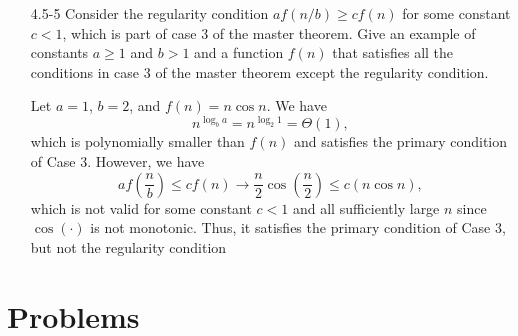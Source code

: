 \begin{enumerate}
\begin{framed}
\end{framed}

\item[4.5{-}5]{Consider the regularity condition $a f(n/b) \ge c f(n)$ for some
constant $c < 1$, which is part of case 3 of the master theorem. Give an example
of constants $a \ge 1$ and $b > 1$ and a function $f(n)$ that satisfies all
the conditions in case 3 of the master theorem except the regularity
condition.}

\begin{framed}
Let $a = 1$, $b = 2$, and $f(n) = n \cos n$. We have
\[
  n^{\log_b a} = n^{\log_2 1} = \Theta(1),
\]
which is polynomially smaller than $f(n)$ and satisfies the primary condition of
Case 3. However, we have
\[
  a f\left(\frac{n}{b}\right) \le c f(n) \rightarrow \frac{n}{2} \cos\left(\frac{n}{2}\right) \le c ( n \cos n ),
\]
which is not valid for some constant $c < 1$ and all sufficiently large $n$
since $\cos(\cdot)$ is not monotonic. Thus, it satisfies the primary condition
of Case 3, but not the regularity condition
\end{framed}

\end{enumerate}

\newpage

\section*{Problems}
%

